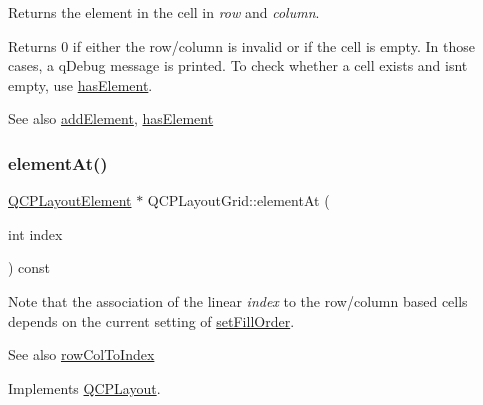 Returns the element in the cell in {\itshape row} and {\itshape column}.

Returns 0 if either the row/column is invalid or if the cell is empty. In those cases, a q\+Debug message is printed. To check whether a cell exists and isn\textquotesingle{}t empty, use \hyperlink{class_q_c_p_layout_grid_ab0cf4f7edc9414a3bfaddac0f46dc0a0}{has\+Element}.

\begin{DoxySeeAlso}{See also}
\hyperlink{class_q_c_p_layout_grid_adff1a2ca691ed83d2d24a4cd1fe17012}{add\+Element}, \hyperlink{class_q_c_p_layout_grid_ab0cf4f7edc9414a3bfaddac0f46dc0a0}{has\+Element} 
\end{DoxySeeAlso}
\mbox{\label{class_q_c_p_layout_grid_a4288f174082555f6bd92021bdedb75dc}} 
\subsubsection{\texorpdfstring{element\+At()}{elementAt()}\hspace{0.1cm}{\footnotesize\ttfamily [1/2]}}
{\footnotesize\ttfamily \hyperlink{class_q_c_p_layout_element}{Q\+C\+P\+Layout\+Element} $\ast$ Q\+C\+P\+Layout\+Grid\+::element\+At (\begin{DoxyParamCaption}\item[{int}]{index }\end{DoxyParamCaption}) const\hspace{0.3cm}{\ttfamily [virtual]}}

Note that the association of the linear {\itshape index} to the row/column based cells depends on the current setting of \hyperlink{class_q_c_p_layout_grid_affc2f3cfd22f28698c5b29b960d2a391}{set\+Fill\+Order}.

\begin{DoxySeeAlso}{See also}
\hyperlink{class_q_c_p_layout_grid_a682ba76f130810ffd294032a1bfbcfcb}{row\+Col\+To\+Index} 
\end{DoxySeeAlso}


Implements \hyperlink{class_q_c_p_layout_afa73ca7d859f8a3ee5c73c9b353d2a56}{Q\+C\+P\+Layout}.

\mbox{\label{class_q_c_p_layout_grid_a8b420c8ecfcd5cfb3673c2dfa0577286}} 
